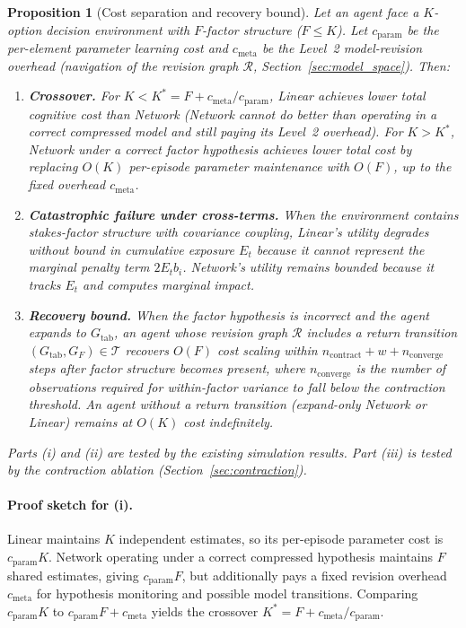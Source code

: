 \documentclass[11pt]{article}
\newtheorem{proposition}{Proposition}
\begin{document}
\begin{proposition}[Cost separation and recovery bound]\label{prop:crossover}
Let an agent face a $K$-option decision environment with $F$-factor structure
($F \leq K$).  Let $c_{\mathrm{param}}$ be the per-element parameter learning
cost and $c_{\mathrm{meta}}$ be the Level~2 model-revision overhead (navigation
of the revision graph $\mathcal{R}$, Section~\ref{sec:model_space}).  Then:
\begin{enumerate}[label=(\roman*)]
\item \textbf{Crossover.}
For $K < K^* = F + c_{\mathrm{meta}}/c_{\mathrm{param}}$, Linear achieves lower
total cognitive cost than Network (Network cannot do better than operating in a
correct compressed model and still paying its Level~2 overhead).
For $K > K^*$, Network under a correct factor hypothesis achieves lower total
cost by replacing $O(K)$ per-episode parameter maintenance with $O(F)$, up to the
fixed overhead $c_{\mathrm{meta}}$.

\item \textbf{Catastrophic failure under cross-terms.}
When the environment contains stakes-factor structure with covariance coupling,
Linear's utility degrades without bound in cumulative exposure $E_t$ because it
cannot represent the marginal penalty term $2E_t b_i$.  Network's utility
remains bounded because it tracks $E_t$ and computes marginal impact.

\item \textbf{Recovery bound.}
When the factor hypothesis is incorrect and the agent expands to
$G_{\mathrm{tab}}$, an agent whose revision graph $\mathcal{R}$ includes a
return transition $(G_{\mathrm{tab}}, G_F) \in \mathcal{T}$ recovers $O(F)$ cost
scaling within $n_{\mathrm{contract}} + w + n_{\mathrm{converge}}$ steps after
factor structure becomes present, where $n_{\mathrm{converge}}$ is the number of
observations required for within-factor variance to fall below the contraction
threshold.  An agent without a return transition (expand-only Network or Linear)
remains at $O(K)$ cost indefinitely.
\end{enumerate}

Parts (i) and (ii) are tested by the existing simulation results.
Part (iii) is tested by the contraction ablation
(Section~\ref{sec:contraction}).
\end{proposition}

\paragraph{Proof sketch for (i).}
Linear maintains $K$ independent estimates, so its per-episode parameter cost is
$c_{\mathrm{param}}K$.  Network operating under a correct compressed hypothesis
maintains $F$ shared estimates, giving $c_{\mathrm{param}}F$, but additionally
pays a fixed revision overhead $c_{\mathrm{meta}}$ for hypothesis monitoring and
possible model transitions.  Comparing $c_{\mathrm{param}}K$ to
$c_{\mathrm{param}}F+c_{\mathrm{meta}}$ yields the crossover
$K^* = F + c_{\mathrm{meta}}/c_{\mathrm{param}}$.
\end{document}
